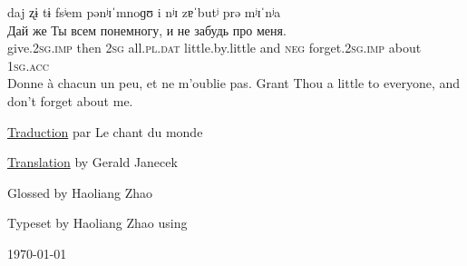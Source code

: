 \documentclass[12pt]{article}
\begin{document}
\begin{exe}
    \glll
    daj ʐɨ tɨ fsʲem pənʲɪˈmnoɡʊ i nʲɪ zɐˈbutʲ prə mʲɪˈnʲa\\
    Дай же Ты всем понемногу, и не забудь про меня.\\
    give.2\textsc{sg.imp} then 2\textsc{sg} all.\textsc{pl.dat} little.by.little and \textsc{neg} forget.2\textsc{sg.imp} about 1\textsc{sg.acc}\\
    \trans
    Donne à chacun un peu, et ne m'oublie pas.
    \trans
    Grant Thou a little to everyone, and don't forget about me.
\end{exe}

\dotfill

\href{http://stengazeta.over-blog.com/article-boulat-okoudjava-fran-ois-villon-52672755.html}{Traduction} par Le chant du monde

\href{https://arlindo-correia.com/120505.html}{Translation} by Gerald Janecek

Glossed by Haoliang Zhao

Typeset by Haoliang Zhao using \XeLaTeX

\today
\end{document}
